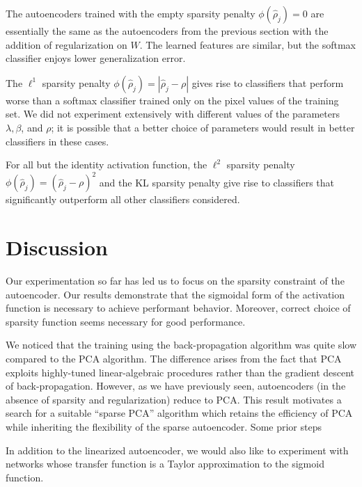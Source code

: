 \documentclass[twocolumn]{article}
\begin{document}
The autoencoders trained with the empty sparsity penalty $\phi(\hat\rho_j)=0$
are essentially the same as the autoencoders from the previous section with the
addition of regularization on $W$. The learned features are similar, but the
softmax classifier enjoys lower generalization error.

The $\ell^1$ sparsity penalty $\phi(\hat\rho_j)=|\hat\rho_j-\rho|$ gives rise
to classifiers that perform worse than a softmax classifier trained only on the
pixel values of the training set. We did not experiment extensively with different
values of the parameters $\lambda,\beta$, and $\rho$; it is possible that a better
choice of parameters would result in better classifiers in these cases.

For all but the identity activation function, 
the $\ell^2$ sparsity penalty $\phi(\hat\rho_j)=(\hat\rho_j-\rho)^2$ and the KL
sparsity penalty give rise to classifiers that significantly outperform all other
classifiers considered.

\section{Discussion}
Our experimentation so far has led us to focus on the sparsity constraint of the
autoencoder. Our results demonstrate that the sigmoidal form of the activation
function is necessary to achieve performant behavior. Moreover, correct choice
of sparsity function seems necessary for good performance.

We noticed that the training using the back-propagation algorithm
\cite{rumelhart2002learning} was quite slow compared to the PCA algorithm. The
difference arises from the fact that PCA exploits highly-tuned linear-algebraic
procedures rather than the gradient descent of back-propagation. However, as we
have previously seen, autoencoders (in the absence of sparsity and
regularization) reduce to PCA. This result motivates a search for a suitable
``sparse PCA'' algorithm which retains the efficiency of PCA while inheriting
the flexibility of the sparse autoencoder. Some prior steps 

In addition to the
linearized autoencoder, we would also like to experiment with networks whose
transfer function is a Taylor approximation to the sigmoid function.
\end{document}
